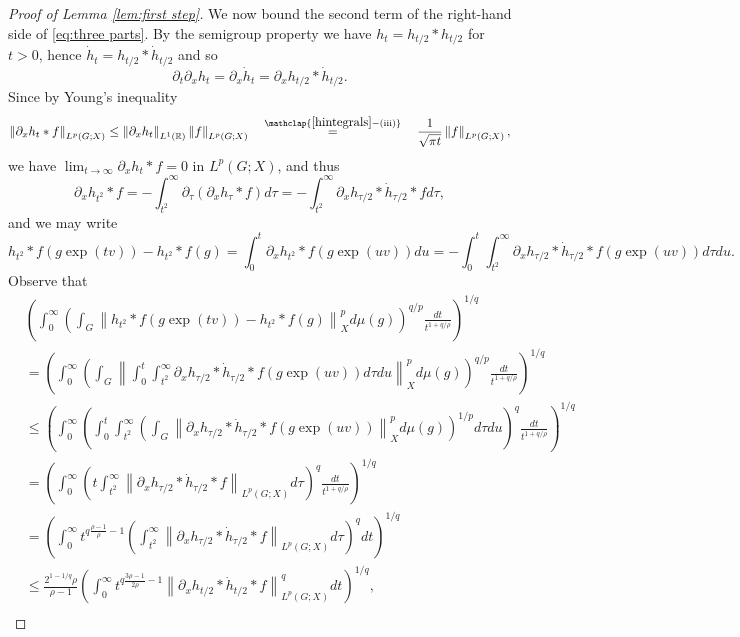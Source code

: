 \documentclass[11pt,reqno]{amsart}
\newcommand{\1}{\mathbf 1}
\begin{document}
\begin{proof}[Proof of Lemma \ref{lem:first step}]
We now bound the second term of the right-hand side of \eqref{eq:three parts}. By the semigroup property we have $h_t=h_{t/2}*h_{t/2}$ for $t>0$, hence $\dot{h}_t=h_{t/2}*\dot{h}_{t/2}$ and so
\[
\partial_t\partial_xh_t=\partial_x\dot{h}_t=\partial_xh_{t/2}*\dot{h}_{t/2}.
\]
Since by Young's inequality
\begin{equation}\label{Rtf0}
\left\|\partial_xh_t*f\right\|_{L^p\left(G;X\right)}\le \left\|\partial_xh_t\right\|_{L^1\left(\mathbb{R}\right)}\left\|f\right\|_{L^p\left(G;X\right)}\quad\stackrel{\mathclap{\eqref{hintegrals}\mathrm{-(iii)}}}{=}\quad\frac{1}{\sqrt{\pi t}}\left\|f\right\|_{L^p\left(G;X\right)},
\end{equation}
we have $\lim_{t\to \infty} \partial_xh_t*f=0$ in $L^p\left(G;X\right)$, and thus
\[
\partial_x h_{t^2}*f=-\int_{t^2}^\infty \partial_\tau\left(\partial_x h_\tau*f\right)d\tau=-\int_{t^2}^\infty \partial_xh_{\tau/2}*\dot{h}_{\tau/2}*fd\tau,
\]
and we may write
\[
h_{t^2}*f\left(g\exp\left(tv\right)\right)-h_{t^2}*f\left(g\right)=\int_0^t \partial_xh_{t^2}*f\left(g\exp\left(uv\right)\right)du=-\int_0^t \int_{t^2}^\infty \partial_xh_{\tau/2}*\dot{h}_{\tau/2}*f\left(g\exp\left(uv\right)\right)d\tau du.
\]
Observe that
\begin{align*}
&\left(\int_0^\infty \left(\int_{G}\left\|h_{t^2}*f\left(g\exp\left(tv\right)\right)-h_{t^2}*f\left(g\right)\right\|_X^pd\mu\left(g\right)\right)^{q/p}\frac{dt}{t^{1+q/\rho}}\right)^{1/q}\\
&=\left(\int_0^\infty\left(\int_{G}\left\|\int_0^t \int_{t^2}^\infty \partial_xh_{\tau/2}*\dot{h}_{\tau/2}*f\left(g\exp\left(uv\right)\right)d\tau du\right\|_X^pd\mu\left(g\right)\right)^{q/p}\frac{dt}{t^{1+q/\rho}}\right)^{1/q}\\
&\le \left(\int_0^\infty\left(\int_0^t \int_{t^2}^\infty \left(\int_{G}\left\|\partial_xh_{\tau/2}*\dot{h}_{\tau/2}*f\left(g\exp\left(uv\right)\right)\right\|_X^pd\mu\left(g\right)\right)^{1/p}d\tau du\right)^q \frac{dt}{t^{1+q/\rho}}\right)^{1/q}\\
&= \left(\int_0^\infty\left(t\int_{t^2}^\infty \left\|\partial_xh_{\tau/2}*\dot{h}_{\tau/2}*f\right\|_{L^p\left(G;X\right)}d\tau\right)^q \frac{dt}{t^{1+q/\rho}}\right)^{1/q}\\
&= \left(\int_0^\infty t^{q\frac{\rho-1}{\rho}-1} \left(\int_{t^2}^\infty \left\|\partial_xh_{\tau/2}*\dot{h}_{\tau/2}*f\right\|_{L^p\left(G;X\right)}d\tau\right)^qdt\right)^{1/q}\\
& \le \frac{2^{1-1/q}\rho}{\rho-1} \left(\int_0^\infty t^{q\frac{3\rho-1}{2\rho}-1} \left\|\partial_xh_{t/2}*\dot{h}_{t/2}*f\right\|_{L^p\left(G;X\right)}^qdt\right)^{1/q},\\

\end{align*}
\end{proof}
\end{document}
